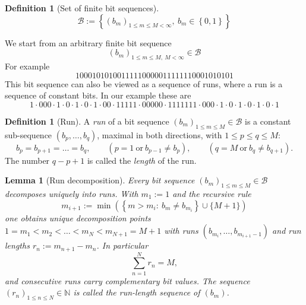 \documentclass[11pt,a4paper]{scrartcl}
\theoremstyle{plain}
\newtheorem{lemma}[satz]{Lemma}
\theoremstyle{definition}
\newtheorem{defi}[satz]{Definition}
\theoremstyle{remark}
\begin{document}
\begin{defi}[Set of finite bit sequences]\label{defi:bitfolgen}
\begin{equation}\label{eqn:mengederbitfolgen}
  \mathcal B := \left\{(b_m)_{1\leq m\leq M<\infty},\ b_m\in\left\{0,1\right\}\right\}
\end{equation}
\end{defi}

\noindent We start from an arbitrary finite bit sequence
\begin{equation}\label{eqn:beliebigebitfolge}
  (b_m)_{1\leq m\leq M,\ M<\infty}\in\mathcal B
\end{equation}
For example
\begin{equation}\label{eqn:runtestfolge}
  10001010100111110000011111110001010101
\end{equation}
This bit sequence can also be viewed as a sequence of runs, where a
run is a sequence of constant bits. In our example these are
\begin{equation}\label{eqn:runtestfolgevonlaeufen}
  1\cdot 000\cdot 1\cdot 0\cdot 1\cdot 0\cdot 1\cdot 00\cdot 11111\cdot
  00000\cdot 1111111\cdot 000\cdot 1\cdot 0\cdot 1\cdot 0\cdot 1\cdot 0\cdot 1
\end{equation}

\begin{defi}[Run]\label{defi:laeufe}
A \emph{run} of a bit sequence $(b_m)_{1\leq m\leq M}\in\mathcal B$ is a
constant sub-sequence $(b_p,\dots,b_q)$, maximal in both directions,
with $1\leq p\leq q\leq M$:
\begin{equation}\label{eqn:mengederlaeufe}
  b_p=b_{p+1}=\dots=b_q,\qquad
  \left(p=1\ \text{or}\ b_{p-1}\neq b_p\right),\qquad
  \left(q=M\ \text{or}\ b_q\neq b_{q+1}\right).
\end{equation}
The number $q-p+1$ is called the \emph{length} of the run.
\end{defi}

\begin{lemma}[Run decomposition]\label{lem:lzerlegung}
Every bit sequence $(b_m)_{1\leq m\leq M}\in\mathcal B$ decomposes
uniquely into runs. With $m_1:=1$ and the recursive rule
\begin{equation}\label{eqn:zerlegung}
  m_{i+1}:=\min\left(\left\{m>m_i:\ b_m\neq b_{m_i}\right\}\cup\{M+1\}\right)
\end{equation}
one obtains unique decomposition points
$1=m_1<m_2<\dots<m_N<m_{N+1}=M+1$ with runs
$(b_{m_i},\dots,b_{m_{i+1}-1})$ and run lengths $r_n:=m_{n+1}-m_n$.
In particular
\begin{equation}
  \sum_{n=1}^{N} r_n=M,
\end{equation}
and consecutive runs carry complementary bit values. The sequence
$(r_n)_{1\leq n\leq N}\in\mathbb N$ is called the \emph{run-length
sequence} of $(b_m)$.
\end{lemma}
\end{document}
